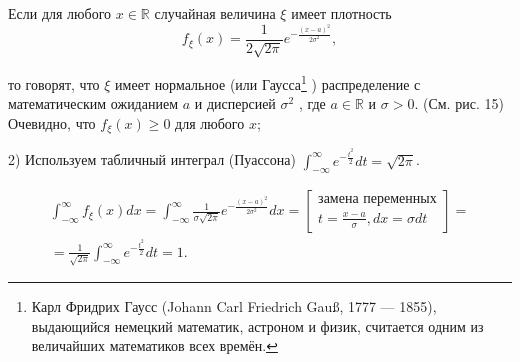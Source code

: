 \begin{definition}
 \label{def:12.8}
Если для любого $x \in \mathbb{R}$ случайная величина $\xi$ имеет плотность
\begin{equation*}
	f_{\xi}(x) = \frac{1}{2 \sqrt{2\pi}}e^{-\frac{(x-a)^2}{2\sigma^2}},
\end{equation*}

то говорят, что $\xi$ имеет нормальное (или Гаусса\footnote{
Карл Фридрих Гаусс (Johann Carl Friedrich Gauß, 1777 — 1855), выдающийся немецкий математик,
астроном и физик, считается одним из величайших математиков всех времён.	
} 
) распределение с математическим ожиданием $a$ и дисперсией $\sigma^2$ , где $a \in \mathbb{R}$ и $\sigma > 0$. (См. рис. 15) Очевидно, что $f_{\xi}(x) \geq 0$ для любого $x$;

2) Используем табличный интеграл (Пуассона)
$\int_{-\infty}^{\infty}e^{-\frac{t^2}{2}}dt=\sqrt{2\pi}$.

\begin{gather*}
	\int_{-\infty}^{\infty} f_{\xi}(x)dx = \int_{-\infty}^{\infty} \frac{1}{\sigma \sqrt{2\pi}}e^{-\frac{(x-a)^2}{2\sigma^2}}dx =
	\left[
	\begin{aligned}
		\text{замена переменных}\\
		t = \frac{x-a}{\sigma}, dx = \sigma dt
	\end{aligned}\right]=\\=
	\frac{1}{\sqrt{2\pi}}\int_{-\infty}^{\infty}e^{-\frac{t^2}{2}}dt=1.
\end{gather*}
\end{definition}

